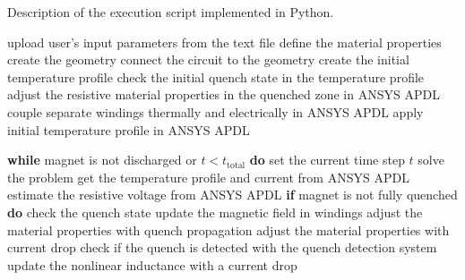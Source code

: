 \begin{algorithm}[H]
  \caption{Description of the execution script implemented in Python.}
  \label{alg:execution_script}
  \begin{algorithmic}[1]
    \STATE upload user's input parameters from the text file
    \color{red} \STATE  define the material properties
    \STATE create the geometry 
    \STATE connect the circuit to the geometry
    \STATE create the initial temperature profile
    \STATE check the initial quench state in the temperature profile
    \STATE adjust the resistive material properties in the quenched zone in ANSYS APDL
    \STATE couple separate windings thermally and electrically in ANSYS APDL
    \color{blue} \STATE apply initial temperature profile in ANSYS APDL
    
    \color{black} \STATE \textbf{while} magnet is not discharged or $t < t_\text{total}$ \textbf{do}
        \color{blue} \STATE \hspace{0.5cm} set the current time step $t$
        \STATE \hspace{0.5cm} solve the problem
        \color{ForestGreen} \STATE \hspace{0.5cm} get the temperature profile and current from ANSYS APDL
        \STATE \hspace{0.5cm} estimate the resistive voltage from ANSYS APDL
        \STATE \hspace{0.5cm} \textbf{if} magnet is not fully quenched \textbf{do}
        \STATE \hspace{1.5cm} check the quench state
        \STATE \hspace{1.5cm} update the magnetic field in windings
        \color{red} \STATE \hspace{1.5cm} adjust the material properties with quench propagation
        \color{red} \STATE \hspace{0.5cm} adjust the material properties with current drop
        \STATE \hspace{0.5cm} check if the quench is detected with the quench detection system
        \STATE \hspace{0.5cm} update the nonlinear inductance with a current drop
  \end{algorithmic}
\end{algorithm}
